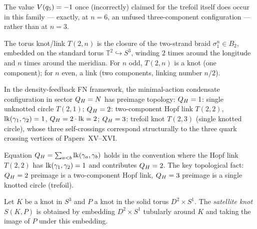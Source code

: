 \begin{remark}
\label{P18:rem:minus_one_at_n6}
The value $V(q_5)=-1$ once (incorrectly) claimed for the trefoil
itself does occur in this family --- exactly, at $n=6$, an unfused
three-component configuration --- rather than at $n=3$.
\end{remark}

\begin{definition}
\label{P18:def:torus_tower}
The torus knot/link $T(2,n)$ is the closure of the two-strand braid
$\sigma_1^n\in B_2$, embedded on the standard torus
$\mathbb{T}^2\hookrightarrow S^3$, winding $2$ times around the
longitude and $n$ times around the meridian. For $n$ odd, $T(2,n)$
is a knot (one component); for $n$ even, a link (two components,
linking number $n/2$).
\end{definition}

\begin{proposition}
\label{P18:prop:preimage_tower}
In the density-feedback FN framework, the minimal-action condensate
configuration in sector $Q_H=N$ has preimage topology:
$Q_H=1$: single unknotted circle $T(2,1)$;
$Q_H=2$: two-component Hopf link $T(2,2)$, $\mathrm{lk}(\gamma_1,\gamma_2)=1$,
$Q_H=2\cdot\mathrm{lk}=2$;
$Q_H=3$: trefoil knot $T(2,3)$ (single knotted circle), whose three
self-crossings correspond structurally to the three quark crossing
vertices of Papers~XV--XVI.
\end{proposition}

\begin{remark}
\label{P18:rem:link_convention}
Equation $Q_H=\sum_{a<b}\mathrm{lk}(\gamma_a,\gamma_b)$ holds in the
convention where the Hopf link $T(2,2)$ has
$\mathrm{lk}(\gamma_1,\gamma_2)=1$ and contributes $Q_H=2$. The key
topological fact: $Q_H=2$ preimage is a two-component Hopf link,
$Q_H=3$ preimage is a single knotted circle (trefoil).
\end{remark}

\begin{definition}
\label{P18:def:satellite}
Let $K$ be a knot in $S^3$ and $P$ a knot in the solid torus
$D^2\times S^1$. The \emph{satellite knot} $S(K,P)$ is obtained by
embedding $D^2\times S^1$ tubularly around $K$ and taking the image
of $P$ under this embedding.
\end{definition}

